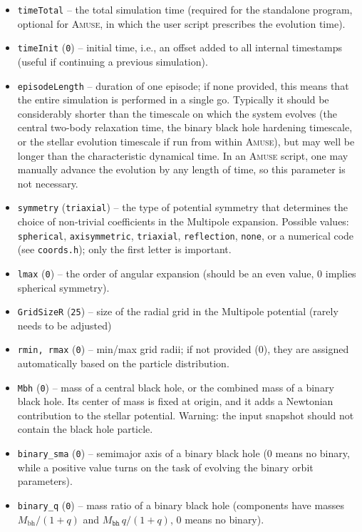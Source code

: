 \documentclass[12pt]{article}
\newcommand{\Amuse}{\textsc{Amuse}\xspace}
\begin{document}
\begin{itemize}
\item \texttt{timeTotal}  -- the total simulation time (required for the standalone program, optional for \Amuse, in which the user script prescribes the evolution time).
\item \texttt{timeInit}  (\texttt{0}) -- initial time, i.e., an offset added to all internal timestamps (useful if continuing a previous simulation).
\item \texttt{episodeLength}  -- duration of one episode; if none provided, this means that the entire simulation is performed in a single go. Typically it should be considerably shorter than the timescale on which the system evolves (the central two-body relaxation time, the binary black hole hardening timescale, or the stellar evolution timescale if run from within \Amuse), but may well be longer than the characteristic dynamical time. In an \Amuse script, one may manually advance the evolution by any length of time, so this parameter is not necessary.
\item \texttt{symmetry}  (\texttt{triaxial}) -- the type of potential symmetry that determines the choice of non-trivial coefficients in the Multipole expansion. Possible values: \texttt{spherical}, \texttt{axisymmetric}, \texttt{triaxial}, \texttt{reflection}, \texttt{none}, or a numerical code (see \texttt{coords.h}); only the first letter is important.
\item \texttt{lmax}  (\texttt{0}) -- the order of angular expansion (should be an even value, 0 implies spherical symmetry).
\item \texttt{GridSizeR}  (\texttt{25}) -- size of the radial grid in the Multipole potential (rarely needs to be adjusted)
\item \texttt{rmin, rmax}  (\texttt{0}) -- min/max grid radii; if not provided (0), they are assigned automatically based on the particle distribution.
\item \texttt{Mbh} (\texttt{0}) -- mass of a central black hole, or the combined mass of a binary black hole. Its center of mass is fixed at origin, and it adds a Newtonian contribution to the stellar potential. Warning: the input snapshot should not contain the black hole particle.
\item \texttt{binary_sma}  (\texttt{0}) -- semimajor axis of a binary black hole (0 means no binary, while a positive value turns on the task of evolving the binary orbit parameters).
\item \texttt{binary_q}  (\texttt{0}) -- mass ratio of a binary black hole (components have masses $M_\mathrm{bh}/(1+q)$ and $M_\texttt{bh}\,q/(1+q)$, 0 means no binary).

\end{itemize}
\end{document}
